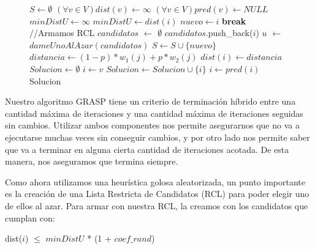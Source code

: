 \begin{center}
 \begin{figure}[H]
  \begin{pseudo}
    \State $S \leftarrow \emptyset$
    \State $(\forall v \in V) dist(v) \leftarrow \infty$
    \State $(\forall v \in V) pred(v) \leftarrow NULL$
    \State $minDistU \leftarrow \infty$
	\State $minDistU \leftarrow dist(i)$
	\State $nuevo \leftarrow i$
      \EndIf
    \EndFor
      \State \textbf{break}
    \EndIf
    \State //Armamos RCL
    \State $candidatos$ $\leftarrow$ $\emptyset$
	\State $candidatos$.push\_back($i$)
      \EndIf
    \EndFor
    \State $u$ $\leftarrow$ $dameUnoAlAzar(candidatos)$
    \State $S \leftarrow S \cup \{nuevo\}$
      \State $distancia \leftarrow (1-p)*w_1(j) + p*w_2(j)$
	\State $dist(i) \leftarrow distancia$
      \EndIf
    \EndFor
    \EndWhile
    \State $Solucion \leftarrow \emptyset$
    \State $i \leftarrow v$
      \State $Solucion \leftarrow Solucion \cup \{i\}$
      \State $i \leftarrow pred(i)$
    \EndWhile
    \Return Solucion
    \EndProcedure
  \end{pseudo}
 \end{figure}
\end{center}

Nuestro algoritmo GRASP tiene un criterio de terminación híbrido entre una cantidad máxima de iteraciones y una cantidad máxima de iteraciones seguidas sin cambios. Utilizar ambos componentes nos permite asegurarnos que no va a ejecutarse muchas veces sin conseguir cambios, y por otro lado nos permite saber que va a terminar en alguna cierta cantidad de iteraciones acotada. De esta manera, nos aseguramos que termina siempre.

Como ahora utilizamos una heurística golosa aleatorizada, un punto importante es la creación de una Lista Restricta de Candidatos (RCL) para poder elegir uno de ellos al azar. Para armar con nuestra RCL, la creamos con los candidatos que cumplan con:

\begin{center}
dist($i$) $\leq$ $minDistU$ * (1 + $coef\_rand$)
\end{center}

